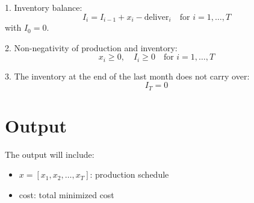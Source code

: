 \documentclass{article}
\begin{document}
1. Inventory balance:
\[
I_i = I_{i-1} + x_i - \text{deliver}_i \quad \text{for } i = 1, \ldots, T
\]
with \( I_0 = 0 \).

2. Non-negativity of production and inventory:
\[
x_i \geq 0, \quad I_i \geq 0 \quad \text{for } i = 1, \ldots, T
\]

3. The inventory at the end of the last month does not carry over:
\[
I_T = 0
\]

\section*{Output}
The output will include:
\begin{itemize}
    \item \( x = [x_1, x_2, \ldots, x_T] \): production schedule
    \item cost: total minimized cost
\end{itemize}
\end{document}
